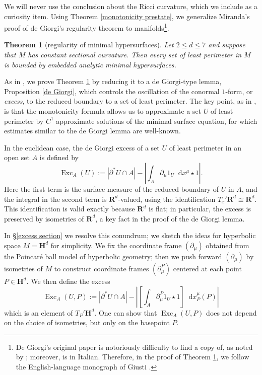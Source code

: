 \documentclass[reqno,10pt]{amsart}
\newcommand{\RR}{\mathbf{R}}
\newcommand{\Hyp}{\mathbf H}
\DeclareMathOperator{\Exc}{Exc}
\newcommand*\dif{\mathop{}\!\mathrm{d}}
\newcommand{\dfn}[1]{\emph{#1}\index{#1}}
\newtheorem{mainthm}{Theorem}
\theoremstyle{definition}
\numberwithin{equation}{section}
\begin{document}
We will never use the conclusion about the Ricci curvature, which we include as a curiosity item.
Using Theorem \ref{monotonicity prestate}, we generalize Miranda's proof \cite{Miranda66} of de Giorgi's regularity theorem \cite{deGiorgi61} to manifolds\footnote{De Giorgi's original paper \cite{deGiorgi61} is notoriously difficulty to find a copy of, as noted by \cite{Miranda66, Giusti77}; moreover, \cite{Miranda66} is in Italian. Therefore, in the proof of Theorem \ref{main lma}, we follow the English-language monograph of Giusti \cite[Part 1]{Giusti77}.}.

\begin{mainthm}[regularity of minimal hypersurfaces]\label{main lma}
Let $2 \leq d \leq 7$ and suppose that $M$ has constant sectional curvature.
Then every set of least perimeter in $M$ is bounded by embedded analytic minimal hypersurfaces.
\end{mainthm}

As in \cite{Miranda66, Giusti77}, we prove Theorem \ref{main lma} by reducing it to a de Giorgi-type lemma, Proposition \ref{de Giorgi}, which controls the oscillation of the conormal $1$-form, or \dfn{excess}, to the reduced boundary to a set of least perimeter.
The key point, as in \cite{Miranda66, Giusti77}, is that the monotonicity formula allows us to approximate a set $U$ of least perimeter by $C^1$ approximate solutions of the minimal surface equation, for which estimates similar to the de Giorgi lemma are well-known.

In the euclidean case, the de Giorgi excess of a set $U$ of least perimeter in an open set $A$ is defined by
$$\Exc_A(U) := |\partial^* U \cap A| - \left|\int_A \partial_\mu 1_U \dif x^\mu \star 1\right|.$$
Here the first term is the surface measure of the reduced boundary of $U$ in $A$, and the integral in the second term is $\RR^d$-valued, using the identification $T_x'\RR^d \cong \RR^d$.
This identification is valid exactly because $\RR^d$ is flat; in particular, the excess is preserved by isometries of $\RR^d$, a key fact in the proof of the de Giorgi lemma.

In \S\ref{excess section} we resolve this conundrum; we sketch the ideas for hyperbolic space $M = \Hyp^d$ for simplicity.
We fix the coordinate frame $(\partial_\mu)$ obtained from the Poincar\'e ball model of hyperbolic geometry; then we push forward $(\partial_\mu)$ by isometries of $M$ to construct coordinate frames $(\partial_\mu^P)$ centered at each point $P \in \Hyp^d$.
We then define the excess
\begin{equation}\label{excess definition prelim}
\Exc_A(U, P) := |\partial^* U \cap A| - \left|\left[\int_A \partial_\mu^P 1_U \star 1\right] \dif x^\mu_P(P)\right|
\end{equation}
which is an element of $T_P' \Hyp^d$.
One can show that $\Exc_A(U, P)$ does not depend on the choice of isometries, but only on the basepoint $P$.
\end{document}
